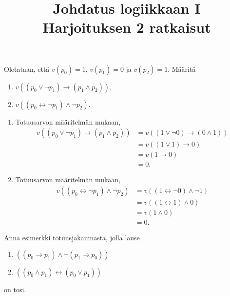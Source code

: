 \documentclass[11pt,a4paper]{amsart}
\title{Johdatus logiikkaan I\\Harjoituksen 2 ratkaisut}
\author{}
\date{}
\begin{document}

\begin{exercise}
  Oletataan, että \(v(p_0) = 1\), \(v(p_1) = 0\) ja \(v(p_2) = 1\). Määritä
\begin{enumerate}[label=\alph*), nosep]
  \item \(v((p_0 \lor \neg p_1) \rightarrow (p_1 \land p_2))\),
  \item \(v((p_0 \leftrightarrow \neg p_1) \land \neg p_2)\).
\end{enumerate}
\end{exercise}

\begin{solution}
\leavevmode\par
\begin{enumerate}[label=\alph*), nosep]
\item Totuusarvon määritelmän mukaan,
  \[
    \begin{aligned}
      v((p_0 \lor \neg p_1) \rightarrow (p_1 \land p_2)) &= v((1 \lor
      \neg 0) \rightarrow (0 \land 1)) \\
      &= v((1 \lor 1) \rightarrow 0) \\
      &= v(1 \rightarrow 0) \\
      &= 0.
    \end{aligned}
  \]

\item Totuusarvon määritelmän mukaan,
  \[
    \begin{aligned}
      v((p_0 \leftrightarrow \neg p_1) \land \neg p_2) &= v((1
      \leftrightarrow \neg 0) \land \neg 1) \\
      &= v((1 \leftrightarrow 1) \land 0) \\
      &= v(1 \land 0) \\
      &= 0.
    \end{aligned}
  \]
\end{enumerate}
\end{solution}

\begin{exercise}
Anna esimerkki totuusjakaumasta, jolla lause
\begin{enumerate}[label=\alph*), nosep]
\item \(((p_0 \rightarrow p_1) \land \neg(p_1 \rightarrow p_0))\)
\item \(((p_0 \land p_1) \leftrightarrow (p_0 \lor p_1))\)
\end{enumerate}
on tosi.
\end{exercise}
\end{document}
